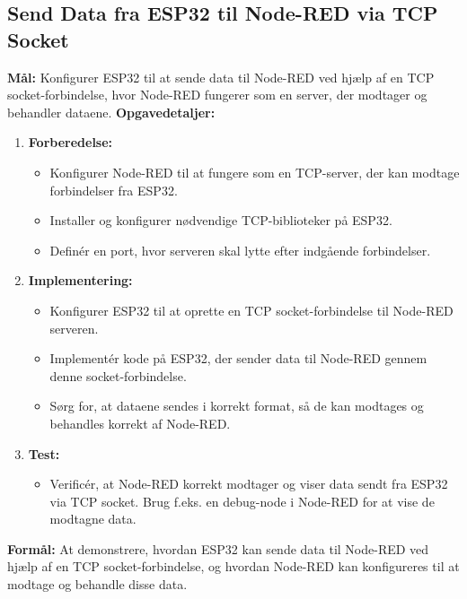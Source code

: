 \subsection*{Send Data fra ESP32 til Node-RED via TCP Socket}
\textbf{Mål:} Konfigurer ESP32 til at sende data til Node-RED ved hjælp af en TCP socket-forbindelse, hvor Node-RED fungerer som en server, der modtager og behandler dataene.
\newline\newline\noindent
\textbf{Opgavedetaljer:}
\begin{enumerate}
	\item \textbf{Forberedelse:}
	\begin{itemize}
		\item Konfigurer Node-RED til at fungere som en TCP-server, der kan modtage forbindelser fra ESP32.
		\item Installer og konfigurer nødvendige TCP-biblioteker på ESP32.
		\item Definér en port, hvor serveren skal lytte efter indgående forbindelser.
	\end{itemize}
	\item \textbf{Implementering:}
	\begin{itemize}
		\item Konfigurer ESP32 til at oprette en TCP socket-forbindelse til Node-RED serveren.
		\item Implementér kode på ESP32, der sender data til Node-RED gennem denne socket-forbindelse.
		\item Sørg for, at dataene sendes i korrekt format, så de kan modtages og behandles korrekt af Node-RED.
	\end{itemize}
	\item \textbf{Test:}
	\begin{itemize}
		\item Verificér, at Node-RED korrekt modtager og viser data sendt fra ESP32 via TCP socket. Brug f.eks. en debug-node i Node-RED for at vise de modtagne data.
	\end{itemize}
\end{enumerate}
\textbf{Formål:} At demonstrere, hvordan ESP32 kan sende data til Node-RED ved hjælp af en TCP socket-forbindelse, og hvordan Node-RED kan konfigureres til at modtage og behandle disse data.

